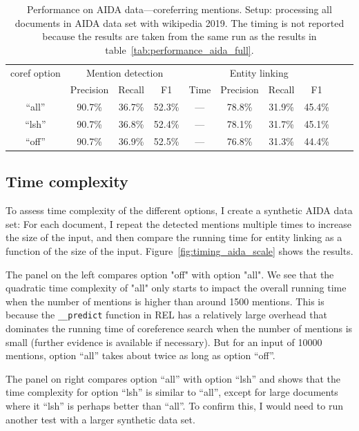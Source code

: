 \documentclass[a4paper,11pt]{article}
\numberwithin{equation}{section} %
\begin{document}
\begin{table}
 \begin{tabular}{c c c c c c c c c c}
\hline
 coref option & \multicolumn{3}{c}{Mention detection} & \multicolumn{4}{c}{Entity linking}  \\
        & Precision & Recall & F1 & Time & Precision & Recall & F1 \\
 \hline 
 ``all'' & 90.7\% & 36.7\% & 52.3\% & --- & 78.8\% & 31.9\% & 45.4\% \\  
 ``lsh'' & 90.7\% & 36.8\% & 52.4\% & --- & 78.1\% & 31.7\% & 45.1\% \\
 ``off'' & 90.7\% & 36.9\% & 52.5\% & --- & 76.8\% & 31.3\% & 44.4\% \\ 
\hline 
\end{tabular}
\caption{Performance on AIDA data---coreferring mentions. Setup: processing all documents in AIDA data set with wikipedia 2019. The timing is not reported because the results are taken from the same run as the results in table~\ref{tab:performance_aida_full}.}
\label{tab:performance_aida_corefs}
\end{table}


\subsection{Time complexity}
To assess time complexity of the different options, I create a synthetic AIDA data set: For each document, I repeat the detected mentions multiple times to increase the size of the input, and then compare the running time for entity linking as a function of the size of the input. Figure~\ref{fig:timing_aida_scale} shows the results.

The panel on the left compares option "off" with option "all". We see that the quadratic time complexity of "all" only starts to impact the overall running time when the number of mentions is higher than around 1500 mentions. This is because the \verb|__predict| function in REL has a relatively large overhead that dominates the running time of coreference search when the number of mentions is small (further evidence is available if necessary). But for an input of 10000 mentions, option ``all'' takes about twice as long as option ``off''. 

The panel on right compares option ``all'' with option ``lsh'' and shows that the time complexity for option ``lsh'' is similar to ``all'', except for large documents where it ``lsh'' is perhaps better than ``all''. To confirm this, I would need to run another test with a larger synthetic data set. 
\end{document}
